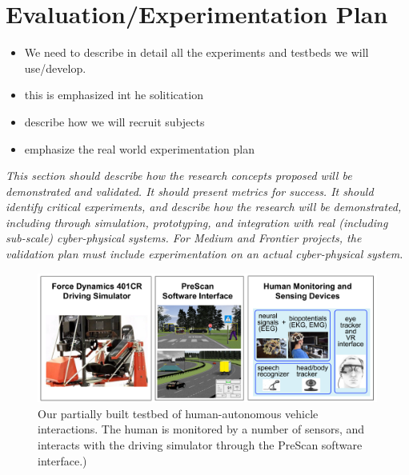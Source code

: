 
\section{Evaluation/Experimentation Plan}
\label{sec:experiment}

\begin{itemize}
    \item We need to describe in detail all the experiments and testbeds we will use/develop.
    \item this is emphasized int he solitication
    \item describe how we will recruit subjects
    \item emphasize the real world experimentation plan
\end{itemize}

\textit{This section should describe how the research concepts proposed will be demonstrated and validated. It should present metrics for success. It should identify critical experiments, and describe how the research will be demonstrated, including through simulation, prototyping, and integration with real (including sub-scale) cyber-physical systems. For Medium and Frontier projects, the validation plan must include experimentation on an actual cyber-physical system.}


\begin{figure}[t]
\centering
\includegraphics[width=.9\textwidth]{figures/testbed}
\caption{Our partially built testbed of human-autonomous vehicle interactions. The human is monitored by a number of sensors, and interacts with the driving simulator through the PreScan software interface.)} 
\label{fig:testbed}
\end{figure}

